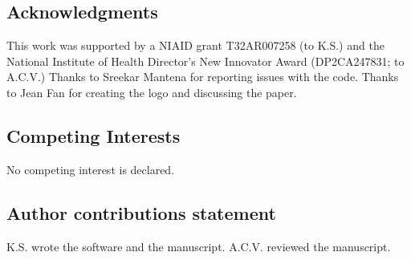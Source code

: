 \subsection{Acknowledgments}

This work was supported by a NIAID grant T32AR007258 (to K.S.) and the National Institute of Health Director’s New Innovator Award (DP2CA247831; to A.C.V.) Thanks to Sreekar Mantena for reporting issues with the code. Thanks to Jean Fan for creating the logo and discussing the paper. 

\subsection{Competing Interests}

No competing interest is declared.

\subsection{Author contributions statement}

K.S. wrote the software and the manuscript. A.C.V. reviewed the manuscript.

